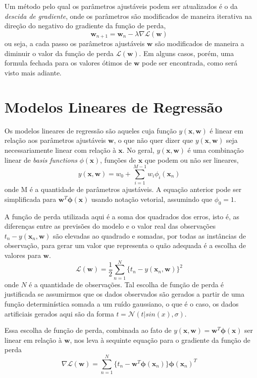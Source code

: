 \documentclass{article}
\begin{document}
Um método pelo qual os parâmetros ajustáveis podem ser atualizados é o da \emph{descida de gradiente}, onde os parâmetros
são modificados de maneira iterativa na direção do negativo do gradiente da função de perda,
\[ \textbf{w}_{n + 1} = \textbf{w}_n - \lambda \nabla \mathcal{L}(\textbf{w}) \]
ou seja, a cada passo os parâmetros ajustáveis \( \textbf{w} \) são modificados de maneira a diminuir o valor da
função de perda \( \mathcal{L}(\textbf{w}) \). Em alguns casos, porém, uma formula fechada para os valores ótimos de \( \textbf{w} \)
pode ser encontrada, como será visto mais adiante.


\section{Modelos Lineares de Regressão}

Os modelos lineares de regressão são aqueles cuja função \( y(\textbf{x}, \textbf{w}) \) é linear em relação aos parâmetros
ajustáveis \( \textbf{w} \), o que não quer dizer que \( y(\textbf{x}, \textbf{w}) \) seja necessariamente linear com relação
à \( \textbf{x} \). No geral, \( y(\textbf{x}, \textbf{w}) \) é uma combinação linear de \emph{basis functions}
\( \phi(\textbf{x}) \), funções de \( \textbf{x} \) que podem ou não ser lineares,
\[ y(\textbf{x}, \textbf{w}) = w_0 + \sum_{i=1}^{M-1} w_i \phi_i(\textbf{x}_n) \]
onde M é a quantidade de parâmetros ajustáveis. A equação anterior pode ser simplificada para \( \textbf{w}^T \boldsymbol{\phi}(\textbf{x}) \)
usando notação vetorial, assumindo que \( \phi_0 = 1 \).

A função de perda utilizada aqui é a soma dos quadrados dos erros, isto é, as diferenças entre as previsões do modelo e o
valor real das observações \( t_n - y(\textbf{x}_n, \textbf{w}) \) são elevadas ao quadrado e somadas, por todas as instâncias
de observação, para gerar um valor que representa o quão adequada é a escolha de valores para \(\textbf{w}\).
\[ \mathcal{L}(\textbf{w}) = \frac{1}{2} \sum_{n=1}^{N} \{ t_n - y(\textbf{x}_n, \textbf{w})\}^2 \]
onde \(N\) é a quantidade de observações. Tal escolha de função de perda é justificada se assumirmos que os dados observados
são gerados a partir de uma função determinística somada a um ruído gaussiano, o que é o caso, os dados artificiais gerados aqui
são da forma \( t = \mathcal{N}(t | sin(x), \sigma) \). 


Essa escolha de função de perda, combinada ao fato de \( y(\textbf{x}, \textbf{w}) = \textbf{w}^T \boldsymbol{\phi}(\textbf{x}) \) ser linear
em relação à \( \textbf{w} \), nos leva à sequinte equação para o gradiente da função de perda
\[ \nabla \mathcal{L}(\textbf{w}) = \sum_{n=1}^{N} \{ t_n - \textbf{w}^T \boldsymbol{\phi}(\textbf{x}_n) \} \boldsymbol{\phi}(\textbf{x}_n)^T \]
\end{document}
